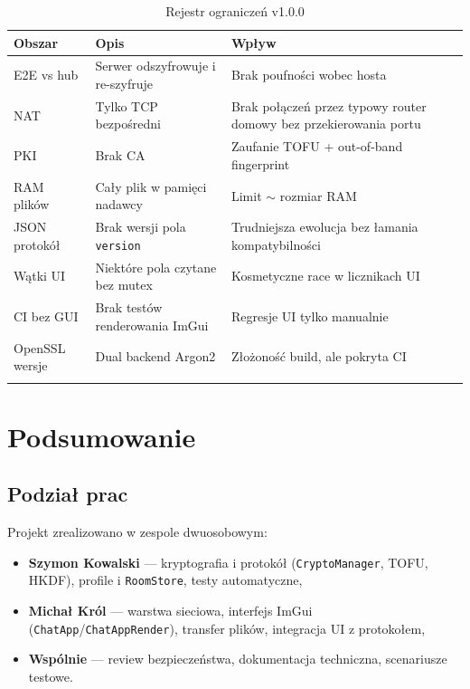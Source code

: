 \documentclass[12pt,a4paper]{article}
\begin{document}
\begin{longtable}{@{}p{2.8cm}p{4cm}p{6.5cm}@{}}
\toprule
\textbf{Obszar} & \textbf{Opis} & \textbf{Wpływ} \\
\midrule
\endhead
E2E vs hub & Serwer odszyfrowuje i re-szyfruje & Brak poufności wobec hosta \\
NAT & Tylko TCP bezpośredni & Brak połączeń przez typowy router domowy bez przekierowania portu \\
PKI & Brak CA & Zaufanie TOFU + out-of-band fingerprint \\
RAM plików & Cały plik w pamięci nadawcy & Limit $\sim$ rozmiar RAM \\
JSON protokół & Brak wersji pola \texttt{version} & Trudniejsza ewolucja bez łamania kompatybilności \\
Wątki UI & Niektóre pola czytane bez mutex & Kosmetyczne race w licznikach UI \\
CI bez GUI & Brak testów renderowania ImGui & Regresje UI tylko manualnie \\
OpenSSL wersje & Dual backend Argon2 & Złożoność build, ale pokryta CI \\
\bottomrule
\caption{Rejestr ograniczeń v1.0.0}
\end{longtable}

\section{Podsumowanie}

\subsection{Podział prac}

Projekt zrealizowano w zespole dwuosobowym:
\begin{itemize}
    \item \textbf{Szymon Kowalski} --- kryptografia i protokół (\texttt{CryptoManager}, TOFU, HKDF), profile i \texttt{RoomStore}, testy automatyczne,
    \item \textbf{Micha{\l} Kr\'{o}l} --- warstwa sieciowa, interfejs ImGui (\texttt{ChatApp}/\texttt{ChatAppRender}), transfer plików, integracja UI z protokołem,
    \item \textbf{Wspólnie} --- review bezpieczeństwa, dokumentacja techniczna, scenariusze testowe.
\end{itemize}
\end{document}
